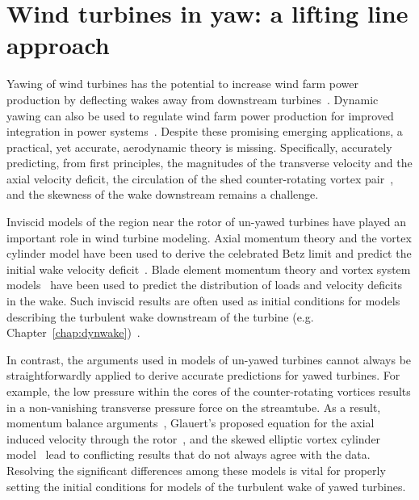 \chapter{Wind turbines in yaw: a lifting line approach}
\label{chap:yaw}

Yawing of wind turbines has the potential to increase wind farm power production by deflecting wakes away from downstream turbines~\cite{Fleming2015a, Bastankhah2016a, Branlard2016a, Howland2016a}. Dynamic yawing can also be used to regulate wind farm power production for improved integration in power systems~\cite{Aho2012a, Shapiro2017a}. Despite these promising emerging applications, a practical, yet accurate, aerodynamic theory is missing. Specifically, accurately predicting, from first principles, the magnitudes of the transverse velocity and the axial velocity deficit, the circulation of the shed counter-rotating vortex pair~\cite{Bastankhah2016a, Howland2016a}, and the skewness of the wake downstream remains a challenge.

Inviscid models of the region near the rotor of un-yawed turbines have played an important role in wind turbine modeling. Axial momentum theory and the vortex cylinder model have been used to derive the celebrated Betz limit and predict the initial wake velocity deficit~\cite{Glauert1935a, Burton2011a}. Blade element momentum theory \cite{Burton2011a,Hansen2008a} and vortex system models~\cite{Glauert1935a, Branlard2015a} have been used to predict the distribution of loads and velocity deficits in the wake. 
Such inviscid results are often used as initial conditions for models describing the turbulent wake downstream of the turbine (e.g. Chapter~\ref{chap:dynwake})~\cite{Jensen1983a, Frandsen2006a}.

In contrast, the arguments used in models of un-yawed turbines cannot always be straightforwardly applied to derive accurate predictions for yawed turbines. For example, the low pressure within the cores of the counter-rotating vortices results in a non-vanishing transverse pressure force on the streamtube. As a result, momentum balance arguments~\cite{Burton2011a, Jimenez2010a}, Glauert's proposed equation for the axial induced velocity through the rotor~\cite{Glauert1926a}, and the skewed elliptic vortex cylinder model~\cite{Coleman1945a,Branlard2016a} lead to conflicting results that do not always agree with the data. Resolving the significant differences among these models is vital for properly setting the initial conditions for models of the turbulent wake of yawed turbines.

